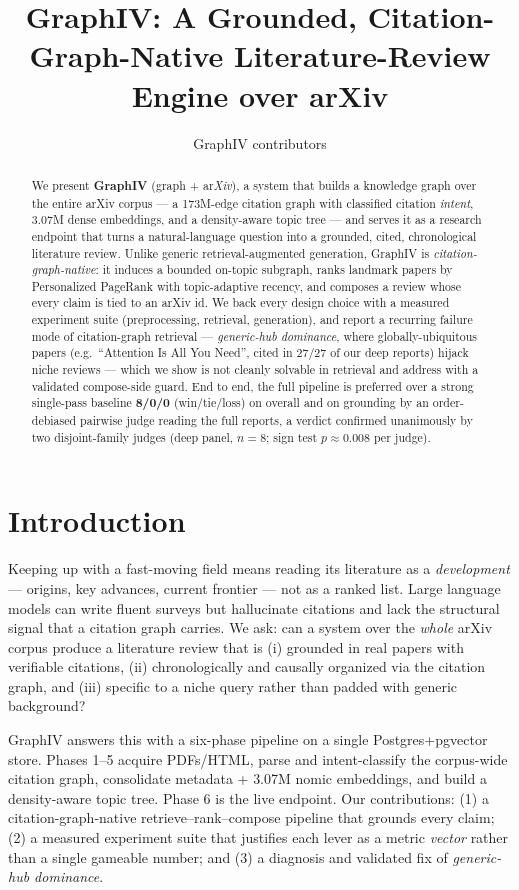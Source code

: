 \documentclass[11pt]{article}
\title{\textbf{GraphIV: A Grounded, Citation-Graph-Native Literature-Review Engine over arXiv}}
\author{GraphIV contributors}
\date{}
\begin{document}
\maketitle

\begin{abstract}
We present \textbf{GraphIV} (graph + ar\emph{Xiv}), a system that builds a knowledge graph over the entire arXiv corpus --- a
173M-edge citation graph with classified citation \emph{intent}, 3.07M dense embeddings, and a
density-aware topic tree --- and serves it as a research endpoint that turns a natural-language question
into a grounded, cited, chronological literature review. Unlike generic retrieval-augmented generation,
GraphIV is \emph{citation-graph-native}: it induces a bounded on-topic subgraph, ranks landmark papers
by Personalized PageRank with topic-adaptive recency, and composes a review whose every claim is tied
to an arXiv id. We back every design choice with a measured experiment suite (preprocessing, retrieval,
generation), and report a recurring failure mode of citation-graph retrieval --- \emph{generic-hub
dominance}, where globally-ubiquitous papers (e.g.\ ``Attention Is All You Need'', cited in 27/27 of our
deep reports) hijack niche reviews --- which we show is not cleanly solvable in retrieval and address
with a validated compose-side guard. End to end, the full pipeline is preferred over a strong
single-pass baseline \textbf{8/0/0} (win/tie/loss) on overall and on grounding by an order-debiased
pairwise judge reading the full reports, a verdict confirmed unanimously by two disjoint-family judges
(deep panel, $n{=}8$; sign test $p \approx 0.008$ per judge).
\end{abstract}

\section{Introduction}
Keeping up with a fast-moving field means reading its literature as a \emph{development} --- origins,
key advances, current frontier --- not as a ranked list. Large language models can write fluent surveys
but hallucinate citations and lack the structural signal that a citation graph carries. We ask: can a
system over the \emph{whole} arXiv corpus produce a literature review that is (i) grounded in real
papers with verifiable citations, (ii) chronologically and causally organized via the citation graph,
and (iii) specific to a niche query rather than padded with generic background?

GraphIV answers this with a six-phase pipeline on a single Postgres+pgvector store. Phases 1--5 acquire
PDFs/HTML, parse and intent-classify the corpus-wide citation graph, consolidate metadata + 3.07M nomic
embeddings, and build a density-aware topic tree. Phase 6 is the live endpoint. Our contributions:
(1) a citation-graph-native retrieve--rank--compose pipeline that grounds every claim;
(2) a measured experiment suite that justifies each lever as a metric \emph{vector} rather than a single
gameable number; and (3) a diagnosis and validated fix of \emph{generic-hub dominance}.
\end{document}
